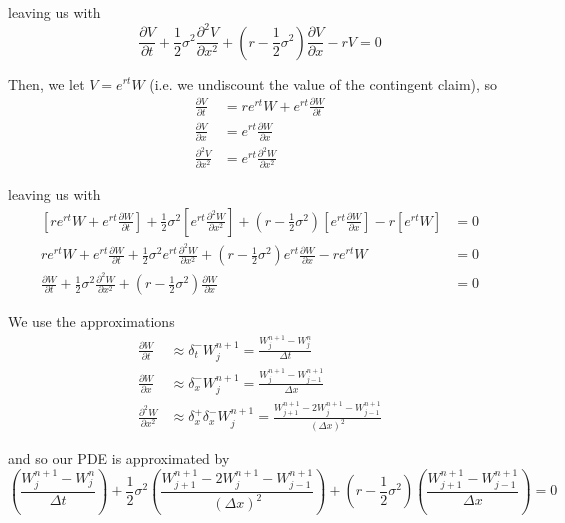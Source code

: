 \documentclass[12pt]{article}
\begin{document}
leaving us with
\begin{equation*}
	\frac{\partial V}{\partial t} + \frac{1}{2}\sigma^2\frac{\partial^2 V}{\partial x^2} + \left(r - \frac{1}{2}\sigma^2\right)\frac{\partial V}{\partial x} - rV = 0
\end{equation*}

Then, we let $V = e^{rt}W$ (i.e. we undiscount the value of the contingent claim), so
\begin{align*}
	\frac{ \partial V }{ \partial t } &= re^{rt}W + e^{rt} \frac{ \partial W }{ \partial t } \\
	\frac{ \partial V }{ \partial x } &= e^{rt} \frac{ \partial W }{ \partial x } \\
	\frac{ \partial^2 V }{ \partial x^2 } &= e^{rt}\frac{ \partial^2 W }{ \partial x^2 }
\end{align*}

leaving us with
\begin{align*}
	\left[ re^{rt}W + e^{rt} \frac{ \partial W }{ \partial t } \right] + \frac{1}{2}\sigma^2 \left[ e^{rt}\frac{ \partial^2 W }{ \partial x^2 } \right] + \left(r - \frac{1}{2}\sigma^2\right) \left[ e^{rt} \frac{ \partial W }{ \partial x } \right] - r\left[ e^{rt}W \right] &= 0 \\
	re^{rt}W + e^{rt} \frac{ \partial W }{ \partial t } + \frac{1}{2}\sigma^2 e^{rt}\frac{ \partial^2 W }{ \partial x^2 } + \left(r - \frac{1}{2}\sigma^2\right) e^{rt} \frac{ \partial W }{ \partial x } - re^{rt}W &= 0 \\
	\frac{\partial W}{\partial t} + \frac{1}{2}\sigma^2\frac{\partial^2 W}{\partial x^2} + \left(r - \frac{1}{2}\sigma^2\right) \frac{\partial W}{\partial x} &= 0
\end{align*}

We use the approximations
\begin{align*}
	\frac{\partial W}{\partial t} &\approx \delta^-_t W^{n + 1}_j = \frac{W^{n + 1}_j - W^n_j}{\Delta t} \\
	\frac{\partial W}{\partial x} &\approx \delta^-_x W^{n + 1}_j = \frac{W^{n + 1}_{j} - W^{n + 1}_{j - 1}}{\Delta x} \\
	\frac{\partial^2 W}{\partial x^2} &\approx \delta^+_x\delta^-_x W^{n + 1}_j = \frac{W^{n + 1}_{j + 1} - 2W^{n + 1}_j - W^{n + 1}_{j - 1}}{(\Delta x)^2}
\end{align*}

and so our PDE is approximated by
\begin{equation*}
	\left(\frac{W^{n + 1}_j - W^n_j}{\Delta t}\right) + \frac{1}{2}\sigma^2 \left( \frac{W^{n + 1}_{j + 1} - 2W^{n + 1}_j - W^{n + 1}_{j - 1}}{(\Delta x)^2} \right) + \left(r - \frac{1}{2}\sigma^2 \right) \left( \frac{W^{n + 1}_{j + 1} - W^{n + 1}_{j - 1}}{\Delta x} \right) = 0
\end{equation*}
\end{document}
